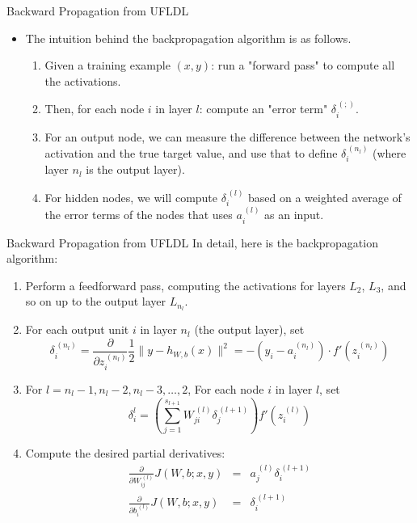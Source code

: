 \documentclass[10pt]{beamer}
\begin{document}
	\begin{frame}{Backward Propagation from UFLDL}
		\begin{itemize}
			\item The intuition behind the backpropagation algorithm is as follows.
			\begin{enumerate}
				\pause
				\item Given a training example $(x, y)$: run a "forward pass" to compute all the activations.
				\pause
				\item Then, for each node $i$ in layer $l$: compute an "error term" $\delta_i^{\,(;)}$.
				\pause
				\item For an output node, we can measure the difference between the network's activation and the true target value, and use that to define $\delta_i^{\,(n_l)}$ (where layer $n_l$ is the output layer).
				\pause
				\item For hidden nodes, we will compute $\delta_i^{\,(l)}$ based on a weighted average of the error terms of the nodes that uses $a_i^{\,(l)}$ as an input.
			\end{enumerate}
		\end{itemize}
	\end{frame}

	\begin{frame}{Backward Propagation from UFLDL}
		In detail, here is the backpropagation algorithm:
		\begin{enumerate}
			\pause
			\item Perform a feedforward pass, computing the activations for layers $L_2$, $L_3$, and so on up to the output layer $L_{n_l}$.
			\pause
			\item For each output unit $i$ in layer $n_l$ (the output layer), set
			$$\delta_i^{\,(n_l)}=\frac{\partial}{\partial z_i^{\,(n_l)}}\frac{1}{2}\lVert y-h_{W,b}(x)\rVert^2=-(y_i-a_i^{\,(n_l)})\cdot f'(z_i^{\,(n_l)})$$
			
			\pause
			\item For $l=n_l-1,n_l-2,n_l-3,\dots,2$, For each node $i$ in layer $l$, set
			$$\delta_i^{l}=\left(\sum_{j=1}^{s_{l+1}}W_{ji}^{\,(l)}\delta_j^{\,(l+1)}\right)f'(z_i^{\,(l)})$$
			
			\pause
			\item Compute the desired partial derivatives:
			\begin{eqnarray*}
				\frac{\partial}{\partial W_{ij}^{\,(l)}}J(W,b;x,y)&=&a_j^{\,(l)}\delta_i^{\,(l+1)}\\
				\frac{\partial}{\partial b_i^{\,(l)}}J(W,b;x,y)&=&\delta_i^{\,(l+1)}
			\end{eqnarray*}
		\end{enumerate}
	\end{frame}
\end{document}
